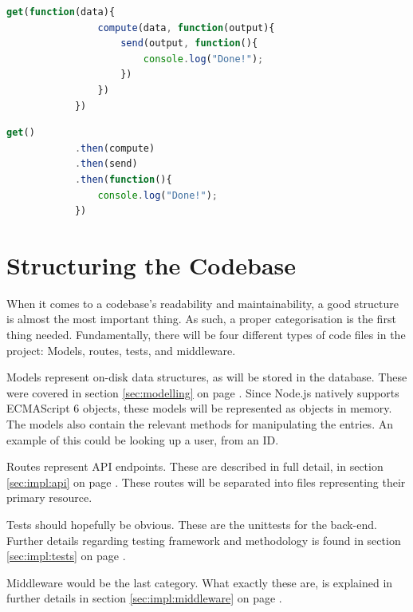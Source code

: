 		\begin{lstlisting}[language=Javascript,gobble=12,caption={Chaining data between callbacks in Node.js},label={lst:node:callbackhell}]
            get(function(data){
                compute(data, function(output){
                    send(output, function(){
                        console.log("Done!");
                    })
                })
            })
		\end{lstlisting}
		
		\begin{lstlisting}[language=Javascript,gobble=12,caption={Chaining data between promises in Node.js},label={lst:node:promisegoodness}]
            get()
            .then(compute)
            .then(send)
            .then(function(){
                console.log("Done!");
            })
		\end{lstlisting}

	\section{Structuring the Codebase}
		\label{sec:impl:backend:codebase}
		When it comes to a codebase's readability and maintainability, a good structure is almost the most important thing. As such, a proper categorisation is the first thing needed. Fundamentally, there will be four different types of code files in the project: Models, routes, tests, and middleware.

		Models represent on-disk data structures, as will be stored in the database. These were covered in section \ref{sec:modelling} on page \pageref{sec:modelling}. Since Node.js natively supports ECMAScript 6 objects, these models will be represented as objects in memory. The models also contain the relevant methods for manipulating the entries. An example of this could be looking up a user, from an ID.

		Routes represent API endpoints. These are described in full detail, in section \ref{sec:impl:api} on page \pageref{sec:impl:api}. These routes will be separated into files representing their primary resource.

		Tests should hopefully be obvious. These are the unittests for the back-end. Further details regarding testing framework and methodology is found in section \ref{sec:impl:tests} on page \pageref{sec:impl:tests}.

		Middleware would be the last category. What exactly these are, is explained in further details in section \ref{sec:impl:middleware} on page \pageref{sec:impl:middleware}.


